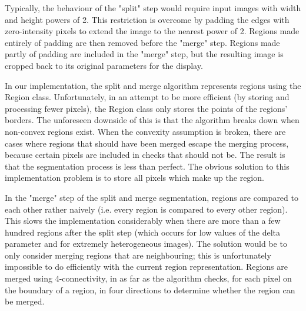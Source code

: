 Typically, the behaviour of the "split" step would require input images with width and height powers of 2. This restriction is overcome by padding the edges with zero-intensity pixels to extend the image to the nearest power of 2. Regions made entirely of padding are then removed before the "merge" step. Regions made partly of padding are included in the "merge" step, but the resulting image is cropped back to its original parameters for the display.

In our implementation, the split and merge algorithm represents regions using the Region class. Unfortunately, in an attempt to be more efficient (by storing and processing fewer pixels), the Region class only stores the points of the regions' borders. The unforeseen downside of this is that the algorithm breaks down when non-convex regions exist. When the convexity assumption is broken, there are cases where regions that should have been merged escape the merging process, because certain pixels are included in checks that should not be. The result is that the segmentation process is less than perfect. The obvious solution to this implementation problem is to store all pixels which make up the region.

 In the "merge" step of the split and merge segmentation, regions are compared to each other rather naively (i.e. every region is compared to every other region). This slows the implementation considerably when there are more than a few hundred regions after the split step (which occurs for low values of the delta parameter and for extremely heterogeneous images). The solution would be to only consider merging regions that are neighbouring; this is unfortunately impossible to do efficiently with the current region representation. Regions are merged using 4-connectivity, in as far as the algorithm checks, for each pixel on the boundary of a region, in four directions to determine whether the region can be merged.
